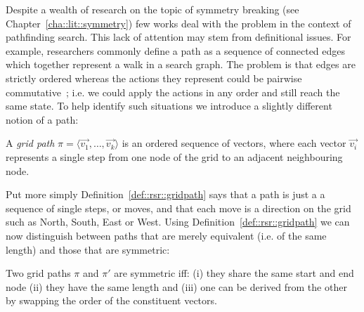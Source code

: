Despite a wealth of research on the topic of symmetry breaking (see
Chapter~\ref{cha::lit::symmetry}) few works deal with the problem in the
context of pathfinding search.  This lack of attention may stem from
definitional issues. For example, researchers commonly define a path as a
sequence of connected edges which together represent a walk in a search graph.
The problem is that edges are strictly ordered whereas the actions they
represent could be pairwise commutative~\citep{haslum00}; i.e. we could apply
the actions in any order and still reach the same state.  To help identify
such situations we introduce a slightly different notion of a path:

\begin{definition}
\label{def::rsr::gridpath}
A \emph{grid path} $\pi = \langle \vec{v_1}, \ldots, \vec{v_k} \rangle$ is an ordered sequence 
of vectors, where each vector $\vec{v_i}$ represents a single step from one node of 
the grid to an adjacent neighbouring node. 
\end{definition}

Put more simply Definition~\ref{def::rsr::gridpath} says that a path is just a
a sequence of single steps, or moves, and that each move is a direction on the 
grid such as North, South, East or West. Using
Definition~\ref{def::rsr::gridpath} we can now distinguish between paths that
are merely equivalent (i.e. of the same length) and those that are symmetric:

\begin{definition}
Two grid paths $\pi$ and $\pi'$ are symmetric iff: (i) they share the same 
start and end node (ii) they have the same length and (iii) one can be derived from 
the other by swapping the order of the constituent vectors.
\end{definition}


